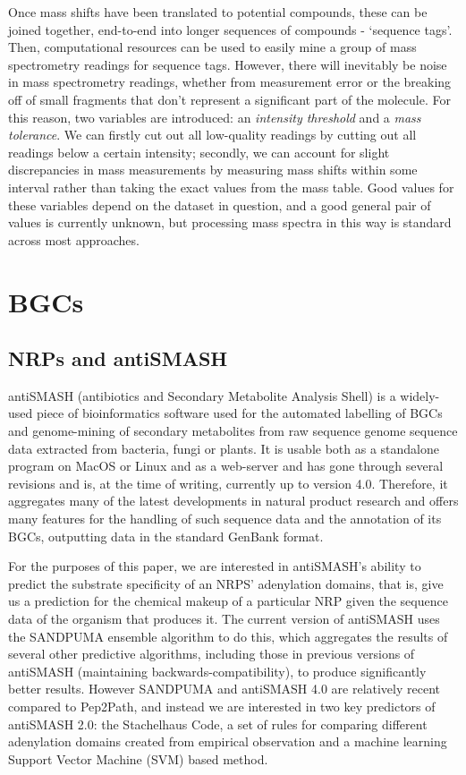 \documentclass{l4proj}
\newcommand{\cit}[1]{\citep{#1}}
\begin{document}
Once mass shifts have been translated to potential compounds, these can be joined together, end-to-end into longer sequences of compounds - `sequence tags'. Then, computational resources can be used to easily mine a group of mass spectrometry readings for sequence tags. However, there will inevitably be noise in mass spectrometry readings, whether from measurement error or the breaking off of small fragments that don't represent a significant part of the molecule. For this reason, two variables are introduced: an \textit{intensity threshold} and a \textit{mass tolerance}. We can firstly cut out all low-quality readings by cutting out all readings below a certain intensity; secondly, we can account for slight discrepancies in mass measurements by measuring mass shifts within some interval rather than taking the exact values from the mass table. Good values for these variables depend on the dataset in question, and a good general pair of values is currently unknown, but processing mass spectra in this way is standard across most approaches.

\section{BGCs}

\subsection{NRPs and antiSMASH}

antiSMASH (antibiotics and Secondary Metabolite Analysis Shell) \cit{as4} is a widely-used piece of bioinformatics software used for the automated labelling of BGCs and genome-mining of secondary metabolites from raw sequence genome sequence data extracted from bacteria, fungi or plants. It is usable both as a standalone program on MacOS or Linux and as a web-server and has gone through several revisions and is, at the time of writing, currently up to version 4.0. Therefore, it aggregates many of the latest developments in natural product research and offers many features for the handling of such sequence data and the annotation of its BGCs, outputting data in the standard GenBank format.

For the purposes of this paper, we are interested in antiSMASH's ability to predict the substrate specificity of an NRPS' adenylation domains, that is, give us a prediction for the chemical makeup of a particular NRP given the sequence data of the organism that produces it. The current version of antiSMASH uses the SANDPUMA ensemble algorithm to do this, which aggregates the results of several other predictive algorithms, including those in previous versions of antiSMASH (maintaining backwards-compatibility), to produce significantly better results. However SANDPUMA and antiSMASH 4.0 are relatively recent compared to Pep2Path, and instead we are interested in two key predictors of antiSMASH 2.0: the Stachelhaus Code, a set of rules for comparing different adenylation domains created from empirical observation \cit{stachelhaus} and a machine learning Support Vector Machine (SVM) based method.
\end{document}
